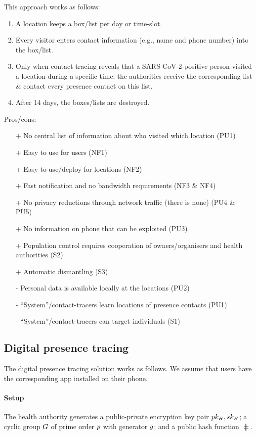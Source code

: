 This approach works as follows:

\begin{enumerate}
\item A location keeps a box/list per day or time-slot.
\item Every visitor enters contact information (e.g., name and phone number) into the box/list.
\item Only when contact tracing reveals that a SARS-CoV-2-positive person visited a location during a specific time: the authorities receive the corresponding list \& contact every presence contact on this list.
\item After 14 days, the boxes/lists are destroyed.
\end{enumerate}

Pros/cons:
\begin{itemize}
\item[+] No central list of information about who visited which location (PU1)
\item[+] Easy to use for users (NF1)
\item[+] Easy to use/deploy for locations (NF2)
\item[+] Fast notification and no bandwidth requirements (NF3 \& NF4)
\item[+] No privacy reductions through network traffic (there is none) (PU4 \& PU5)
\item[+] No information on phone that can be exploited (PU3)
\item[+] Population control requires cooperation of owners/organisers and health authorities (S2)
\item[+] Automatic dismantling (S3)
\item[-] Personal data is available locally at the locations (PU2)
\item[-] ``System''/contact-tracers learn locations of presence contacts (PU1)
\item[-] ``System''/contact-tracers can target individuals (S1)
\end{itemize}

\subsection{Digital presence tracing}



The digital presence tracing solution works as follows. We assume that users have the corresponding app installed on their phone.

\paragraph{Setup} The health authority generates a public-private encryption key pair $pk_{H}, sk_{H}$; a cyclic group $G$ of prime order $p$ with generator $g$; and a public hash function $\hash$.

